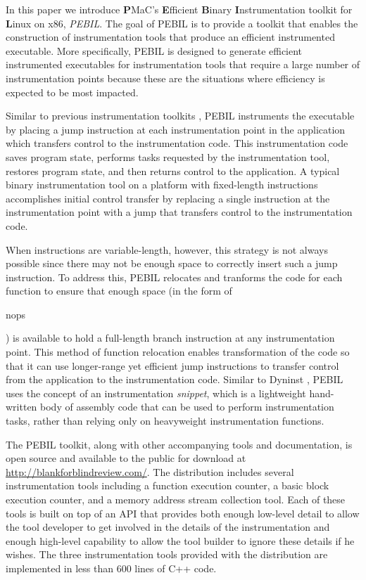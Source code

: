 In this paper we introduce \textbf{P}MaC's \textbf{E}fficient
\textbf{B}inary \textbf{I}nstrumentation toolkit for \textbf{L}inux on
x86, \textit{PEBIL}. The goal of PEBIL is to provide a toolkit that
enables the construction of instrumentation tools that produce an efficient
instrumented executable. More specifically, PEBIL is designed to generate
efficient instrumented executables for instrumentation tools that require a
large number of instrumentation points because these are the situations where
efficiency is expected to be most impacted. 

Similar to previous instrumentation
toolkits \cite{buck2000api}, PEBIL instruments the executable by placing a jump
instruction at each instrumentation point in the application which transfers
control to the instrumentation code. This instrumentation code saves program
state, performs tasks requested by the instrumentation tool, restores program
state, and then returns control to the application. A typical binary
instrumentation tool on a platform with fixed-length instructions
\cite{tikir2006pmac} accomplishes initial control transfer by replacing a single
instruction at the instrumentation point with a jump that transfers control to
the instrumentation code. 

When instructions are variable-length, however, this strategy is not always
possible since there may not be enough space to correctly insert such a jump
instruction. To address this, PEBIL relocates and tranforms the code for each
function to ensure that enough space (in the form of \begin{it}nops\end{it}) is
available to hold a full-length branch instruction at any instrumentation
point. This method of function relocation enables transformation of the code so
that it can use longer-range yet efficient jump instructions to transfer control
from the application to the instrumentation code. Similar to Dyninst
\cite{buck2000api}, PEBIL uses the concept of an instrumentation
\textit{snippet}, which is a lightweight hand-written body of assembly code that
can be used to perform instrumentation tasks, rather than relying only on
heavyweight instrumentation functions.

The PEBIL toolkit, along with other accompanying tools and documentation, is
open source and available to the public for download at
\url{http://blankforblindreview.com/}. The distribution includes
several instrumentation tools including a function execution counter, a basic
block execution counter, and a memory address stream collection tool. Each of
these tools is built on top of an API that provides both enough low-level detail
to allow the tool developer to get involved in the details of the
instrumentation and enough high-level capability to allow the tool builder to
ignore these details if he wishes. The three instrumentation tools provided with
the distribution are implemented in less than 600 lines of C++ code. 

